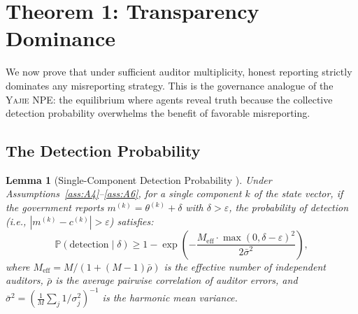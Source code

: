 \documentclass[11pt,a4paper]{article}
\newtheorem{lemma}[theorem]{Lemma}
\theoremstyle{definition}
\newcommand{\Yajie}{\textsc{Yajie}}
\newcommand{\Pbb}{\mathbb{P}}
\newcommand{\abs}[1]{\left|#1\right|}
\begin{document}
\section{Theorem 1: Transparency Dominance}
\label{sec:transparency}
We now prove that under sufficient auditor multiplicity, honest reporting strictly dominates any misreporting strategy. This is the governance analogue of the \Yajie{} NPE: the equilibrium where agents reveal truth because the collective detection probability overwhelms the benefit of favorable misreporting.
\subsection{The Detection Probability}
\begin{lemma}[Single-Component Detection Probability ]
\label{lem:detection_prob}
Under Assumptions~\ref{ass:A4}--\ref{ass:A6}, for a single component $k$ of the state vector, if the government reports $m^{(k)} = \theta^{(k)} + \delta$ with $\delta > \varepsilon$, the probability of detection (i.e., $\abs{m^{(k)} - c^{(k)}} > \varepsilon$) satisfies:
\begin{equation}
    \Pbb(\text{detection} \mid \delta) \geq 1 - \exp\left(-\frac{M_{\mathrm{eff}} \cdot \max(0, \delta - \varepsilon)^2}{2\bar{\sigma}^2}\right),
    \label{eq:detection_prob_lemma}
\end{equation}
where $M_{\mathrm{eff}} = M / (1 + (M-1)\bar{\rho})$ is the effective number of independent auditors, $\bar{\rho}$ is the average pairwise correlation of auditor errors, and $\bar{\sigma}^2 = (\frac{1}{M}\sum_j 1/\sigma_j^2)^{-1}$ is the harmonic mean variance.
\end{lemma}
\end{document}
